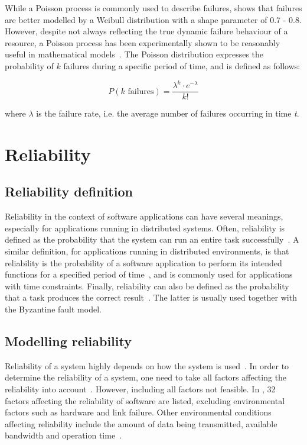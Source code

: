 \documentclass{cslthse-msc}
\begin{document}
While a Poisson process is commonly used to describe failures, \cite{studyOfFailures} shows that failures are better modelled by a Weibull distribution with a shape parameter of 0.7 - 0.8. However, despite not always reflecting the true dynamic failure behaviour of a resource, a Poisson process has been experimentally shown to be reasonably useful in mathematical models~\cite{experimentalFailureAssessment}. The Poisson distribution expresses the probability of $k$ failures during a specific period of time, and is defined as follows:

\begin{equation} \label{eq:Poisson}
P(k \mbox{ failures}) = \dfrac{\lambda^k \cdot e^{-\lambda}}{k!}
\end{equation}

where $\lambda$ is the failure rate, i.e. the average number of failures occurring in time \emph{t}. 

\section{Reliability} \label{sec:background_reliability}
\subsection{Reliability definition} \label{subsec:background_reliability_definition}
Reliability in the context of software applications can have several meanings, especially for applications running in distributed systems. Often, reliability is defined as the probability that the system can run an entire task successfully~\cite{taskAllocation, relModelDistSimSystem, studyServiceRel, hierarchicalRelModeling, generalAlgoRelEval, realTimeRelAnalysis, perfRelNonMarkovian}. A similar definition, for applications running in distributed environments, is that reliability is the probability of a software application to perform its intended functions for a specified period of time~\cite{surveyReliabilityDistr, surveyRelPrediction, relDistApplications}, and is commonly used for applications with time constraints. Finally, reliability can also be defined as the probability that a task produces the correct result~\cite{surveyRelPrediction, relAndPerfGridServices, relGridServicePredConstraint, relModelWebServices, selfAdaptRel}. The latter is usually used together with the Byzantine fault model. 

\subsection{Modelling reliability} \label{subsec:background_modelling_rel}
Reliability of a system highly depends on how the system is used~\cite{surveyRelPrediction}. In order to determine the reliability of a system, one need to take all factors affecting the reliability into account~\cite{surveyReliabilityDistr}. However, including all factors not feasible. In \cite{factorsAffectingRel}, 32 factors affecting the reliability of software are listed, excluding environmental factors such as hardware and link failure. Other environmental conditions affecting reliability include the amount of data being transmitted, available bandwidth and operation time~\cite{cloudServiceRel, hierarchicalRelModeling}.
\end{document}
